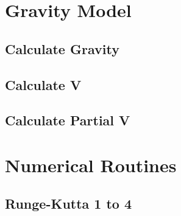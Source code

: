 \section{Gravity Model}
\label{app:matlab_Gravity}
\subsection{Calculate Gravity}
\footnotesize{}
\subsection{Calculate V}
\footnotesize{}
\subsection{Calculate Partial V}
\footnotesize{}

\clearpage

\section{Numerical Routines}\label{app:Dates_and_Times}
\subsection{Runge-Kutta 1 to 4}\label{app:RK}
\footnotesize{}


\clearpage